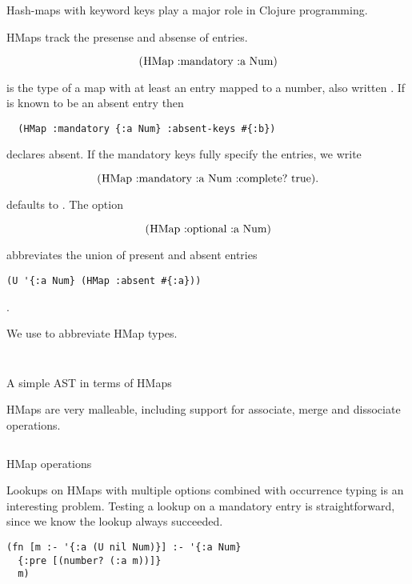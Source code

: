 Hash-maps with keyword keys play a major role in Clojure programming.

HMaps track the presense and absense of entries.

$$
\clj{(HMap :mandatory {:a Num})} 
$$

is the type of a map with at least an  entry mapped to a number,
also written . If  is known to be an absent entry
then

\smallskip
\begin{verbatim}
  (HMap :mandatory {:a Num} :absent-keys #{:b})
\end{verbatim}

declares  absent. If the mandatory keys fully specify the
entries, we write

$$
\clj{(HMap :mandatory {:a Num} :complete? true)}.
$$

 defaults to .
The  option 

$$
\clj{(HMap :optional {:a Num})}
$$

abbreviates the union of present and absent entries

\smallskip
\begin{verbatim}
(U '{:a Num} (HMap :absent #{:a}))
\end{verbatim}
.


We use  to abbreviate HMap types.

\begin{listing}
\inputminted[firstline=5,lastline=8]{clojure}{code/demo/src/demo/hmap.clj}
\inputminted[firstline=26,lastline=28]{clojure}{code/demo/src/demo/hmap.clj}
\caption{A simple AST in terms of HMaps}
\end{listing}


HMaps are very malleable, including support for associate, merge and dissociate operations.

\begin{listing}
\inputminted[firstline=10,lastline=24]{clojure}{code/demo/src/demo/hmap.clj}
\caption{HMap operations}
\end{listing}

Lookups on HMaps with multiple options combined with
occurrence typing is an interesting problem.
Testing a lookup on a mandatory entry is straightforward, since we
know the lookup always succeeded.

\begin{verbatim}
(fn [m :- '{:a (U nil Num)}] :- '{:a Num}
  {:pre [(number? (:a m))]}
  m)
\end{verbatim}

